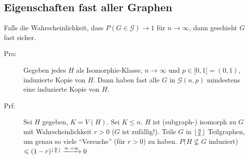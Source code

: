 \subsection{Eigenschaften fast aller Graphen}
Falls die Wahrscheinlichkeit, dass $P(G \in \mathcal{G}) \rightarrow 1$ für $n \rightarrow \infty$, dann geschieht $G$ fast sicher.
\begin{description}
    \item[Pro:] Gegeben jedes $H$ als Isomorphie-Klasse, $n \rightarrow \infty$ und $p \in{} ]0,1[{} = (0,1)$, induzierte Kopie von $H$. 
    Dann haben fast alle $G$ in $\mathcal{G}(n,p)$ mindestens eine induzierte Kopie von $H$.
    \item[Prf:] Sei $H$ gegeben, $K=V(H)$. Sei $K \leqslant n$. $H$ ist (subgraph-) isomorph zu $G$ mit Wahrscheinlichkeit $r > 0$ ($G$ ist zufällig!).
        Teile $G$ in $\lfloor {n \over k} \rfloor$ Teilgraphen, um genau so viele ``Versuche'' (für $r > 0$) zu haben. 
        $P(H \not \subseteq G$ induziert) $\leqslant (1-r)^{\lfloor {n \over k} \rfloor} \xrightarrow{n \rightarrow \infty} 0$
\end{description}

